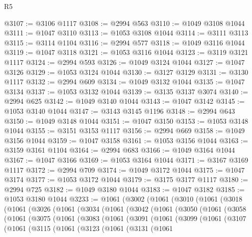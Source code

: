 \begin{lexlean}{R5}
\begin{coremodule}
@3107 := @3106 @1117
@3108 := @2994 @563
@3110 := @1049 @3108 @1044
@3111 := @1047 @3110
@3113 := @1053 @3108 @1044
@3114 := @3111 @3113
@3115 := @3114 @1104
@3116 := @2994 @577
@3118 := @1049 @3116 @1044
@3119 := @1047 @3118
@3121 := @1053 @3116 @1044
@3123 := @3119 @3121 @1117
@3124 := @2994 @593
@3126 := @1049 @3124 @1044
@3127 := @1047 @3126
@3129 := @1053 @3124 @1044
@3130 := @3127 @3129
@3131 := @3130 @1117
@3132 := @2994 @609
@3134 := @1049 @3132 @1044
@3135 := @1047 @3134
@3137 := @1053 @3132 @1044
@3139 := @3135 @3137 @3074
@3140 := @2994 @625
@3142 := @1049 @3140 @1044
@3143 := @1047 @3142
@3145 := @1053 @3140 @1044
@3147 := @3143 @3145 @1196
@3148 := @2994 @643
@3150 := @1049 @3148 @1044
@3151 := @1047 @3150
@3153 := @1053 @3148 @1044
@3155 := @3151 @3153 @1117
@3156 := @2994 @669
@3158 := @1049 @3156 @1044
@3159 := @1047 @3158
@3161 := @1053 @3156 @1044
@3163 := @3159 @3161 @1104
@3164 := @2994 @683
@3166 := @1049 @3164 @1044
@3167 := @1047 @3166
@3169 := @1053 @3164 @1044
@3171 := @3167 @3169 @1117
@3172 := @2994 @709
@3174 := @1049 @3172 @1044
@3175 := @1047 @3174
@3177 := @1053 @3172 @1044
@3179 := @3175 @3177 @1117
@3180 := @2994 @725
@3182 := @1049 @3180 @1044
@3183 := @1047 @3182
@3185 := @1053 @3180 @1044
@3233 := @1061
    (@3002
      (@1061
        (@3010
          (@1061
            (@3018
              (@1061
                (@3026
                  (@1061
                    (@3034
                      (@1061
                        (@3042
                          (@1061
                            (@3050
                              (@1061
                                (@3058
                                  (@1061
                                    (@3075
                                      (@1061
                                        (@3083
                                          (@1061
                                            (@3091
                                              (@1061
                                                (@3099
                                                  (@1061
                                                    (@3107
                                                      (@1061
                                                        (@3115
                                                          (@1061
                                                            (@3123
                                                              (@1061
                                                                (@3131
                                                                  (@1061

\end{coremodule}
\end{lexlean}
